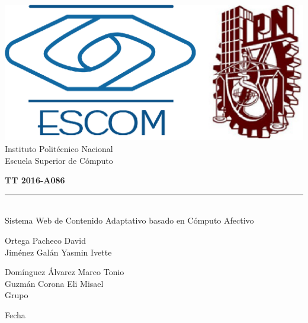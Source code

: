 
\begin{titlepage}

    \centering %

    	\includegraphics[scale=0.17]{imagenes/escom-ipn} %
    	\LARGE{\\ Instituto Polit\'ecnico Nacional} %
    	\LARGE{\\ Escuela Superior de C\'omputo} %

    	\vspace{1cm} %

    	\LARGE \textbf{TT 2016-A086\\}
    	\rule{7cm}{3pt} %
    	\LARGE {\\Sistema Web de Contenido Adaptativo basado en C\'omputo Afectivo}

    	\vspace{1cm} %

    	\LARGE {Ortega Pacheco David\\
    			Jim\'enez Gal\'an Yasmin Ivette}

    	\vspace{1cm} %

   	Dom\'inguez \'Alvarez Marco Tonio\\
   	Guzm\'an Corona Eli Misael\\
    	Grupo

    	\vspace{1cm} %

	Fecha

\end{titlepage}